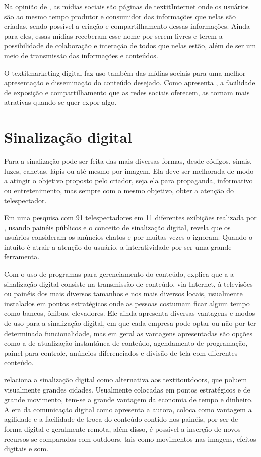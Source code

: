 Na opinião de \cite{torres2000}, as mídias sociais são páginas de textit{Internet} onde os usuários são ao mesmo tempo produtor e consumidor das informações que nelas são criadas, sendo possível a criação e compartilhamento dessas informações. Ainda para eles, essas mídias receberam esse nome por serem livres e terem a possibilidade de
colaboração e interação de todos que nelas estão, além de ser um meio de transmissão das informações e conteúdos.

O textit{marketing} digital faz uso também das mídias sociais para uma melhor apresentação e disseminação do conteúdo desejado. Como apresenta \cite{torres2000}, a facilidade de exposição e compartilhamento que as redes sociais oferecem, as tornam mais atrativas quando se quer expor algo.

\section{Sinalização digital}
Para \cite{munari2006} a sinalização pode ser feita das mais diversas formas, desde códigos, sinais, luzes, canetas, lápis ou até mesmo por imagem. Ela deve ser melhorada de modo a atingir o objetivo proposto pelo criador, seja ela para propaganda, informativo ou entretenimento, mas sempre com o mesmo objetivo, obter a atenção do telespectador.

Em uma pesquisa com 91 telespectadores em 11 diferentes exibições realizada por \cite{muller2009}, usando painéis públicos e o conceito de sinalização digital, revela que os usuários consideram os anúncios chatos e por muitas vezes o ignoram. Quando o intuito é atrair a atenção do usuário, a interatividade por ser uma grande ferramenta.

Com o uso de programas para gerenciamento do conteúdo, \cite[p.31]{machado2010} explica que a a sinalização digital consiste na transmissão de conteúdo, via Internet, à televisões ou painéis dos mais diversos tamanhos e nos mais diversos locais, usualmente instalados em pontos estratégicos onde as pessoas costumam ficar algum tempo como bancos, ônibus, elevadores. Ele ainda apresenta diversas vantagens e modos de uso para a sinalização digital, em que cada empresa pode optar ou não por ter determinada funcionalidade, mas em geral as vantagens apresentadas são opções como a de atualização instantânea de conteúdo, agendamento de programação, painel para controle, anúncios diferenciados e divisão de tela com diferentes conteúdo.

\cite[p.11]{cintra2010} relaciona a sinalização digital como alternativa aos textit{outdoors}, que poluem visualmente grandes cidades. Usualmente colocadas em pontos estratégicos e de grande movimento, tem-se a grande vantagem da economia de tempo e dinheiro. A era da comunicação digital como apresenta a autora, coloca como vantagem a agilidade e a facilidade de troca do conteúdo contido nos painéis, por ser de forma digital e geralmente remota, além disso, é possível a inserção de novos recursos se comparados com outdoors, tais como movimentos nas imagens, efeitos digitais e som.

